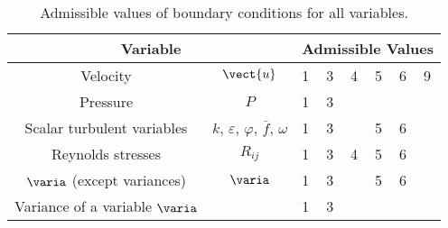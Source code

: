 \begin{table}
\begin{center}
\begin{tabular}{||c|c||p{}|p{}|p{}|p{}|p{}|p{}||}
\hline
\multicolumn{2}{||c||}{Variable}
        &\multicolumn{6}{c||}{Admissible Values}\\
\hline
Velocity                       & $\vect{u}$                                                &  1& 3& 4& 5& 6& 9 \\
Pressure                       & $P$                                                       &  1& 3&  &  & & \\
Scalar turbulent variables     & $k$, $\varepsilon$, $\varphi$, $\bar{f}$, $\omega$        &  1& 3&  & 5& 6& \\
Reynolds stresses              & $R_{ij}$                                                  &  1& 3& 4& 5& 6& \\
$\varia$ (except variances)    &  $\varia$                                                 &  1& 3&  & 5& 6& \\
Variance of a variable $\varia$ &                                                          &  1& 3&  &  & & \\
\hline
\end{tabular}
\end{center}
\caption{Admissible values of boundary conditions for all variables.}\label{tab:ICODCLadm_condli}
\end{table}
